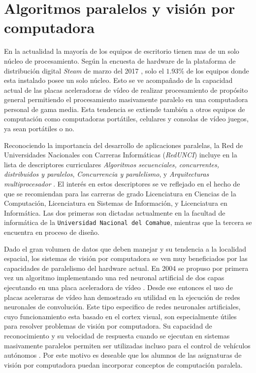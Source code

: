 
\section{Algoritmos paralelos y visión por computadora}

En la actualidad la mayoría de los equipos de escritorio tienen mas de un solo
núcleo de procesamiento. Según la encuesta de hardware de la plataforma de
distribución digital \emph{Steam} de marzo del 2017 \cite{steamSurvey}, solo
el $1.93$\% de los equipos donde esta instalado posee un solo núcleo. Esto se
ve acompañado de la capacidad actual de las placas aceleradoras de vídeo de
realizar procesamiento de propósito general permitiendo el procesamiento
masivamente paralelo en una computadora personal de gama media. Esta tendencia
se extiende también a otros equipos de computación como computadoras
portátiles, celulares y consolas de vídeo juegos, ya sean portátiles o no.

Reconociendo la importancia del desarrollo de aplicaciones paralelas, la Red
de Universidades Nacionales con Carreras Informáticas (\emph{RedUNCI}) incluye
en la lista de descriptores curriculares \emph{Algoritmos secuenciales,
concurrentes, distribuidos y paralelos}, \emph{Concurrencia y paralelismo}, y
\emph{Arquitecturas multiprocesador} \cite{RedUNCI2015}. El interés en estos
descriptores se ve reflejado en el hecho de que se recomiendan para las
carreras de grado Licenciatura en Ciencias de la Computación, Licenciatura en
Sistemas de Información, y Licenciatura en Informática. Las dos primeras son
dictadas actualmente en la facultad de informática de la \texttt{Universidad
Nacional del Comahue}, mientras que la tercera se encuentra en proceso de
diseño.

Dado el gran volumen de datos que deben manejar y su tendencia a la localidad
espacial, los sistemas de visión por computadora se ven muy beneficiados por
las capacidades de paralelismo del hardware actual. En 2004 se propuso por
primera vez un algoritmo implementando una red neuronal artificial de dos
capas ejecutando en una placa aceleradora de vídeo \cite{GPUforMLA}. Desde ese
entonces el uso de placas aceleraras de vídeo han demostrado su utilidad en la
ejecución de redes neuronales de convolución. Este tipo especifico de redes
neuronales artificiales, cuyo funcionamiento esta basado en el cortex visual,
son especialmente útiles para resolver problemas de visión por computadora. Su
capacidad de reconocimiento y su velocidad de respuesta cuando se ejecutan en
sistemas masivamente paralelos permiten ser utilizadas incluso para el control
de vehículos autónomos \cite{e2eLearning4SDC}. Por este motivo es deseable que
los alumnos de las asignaturas de visión por computadora puedan incorporar
conceptos de computación paralela.

